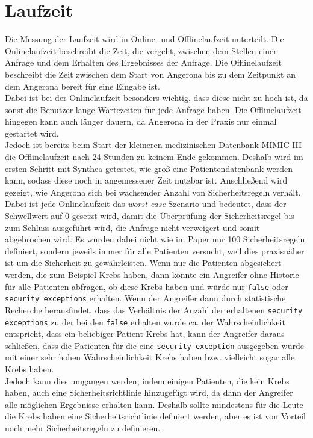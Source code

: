 \documentclass[german,version-2020-11]{uzl-thesis}
\begin{document}
\section{Laufzeit}
Die Messung der Laufzeit wird in Online- und Offlinelaufzeit unterteilt. Die Onlinelaufzeit beschreibt die Zeit, die vergeht, zwischen dem Stellen einer Anfrage und dem Erhalten des Ergebnisses der Anfrage. Die Offlinelaufzeit beschreibt die Zeit zwischen dem Start von Angerona bis zu dem Zeitpunkt an dem Angerona bereit für eine Eingabe ist. \\ 
Dabei ist bei der Onlinelaufzeit besonders wichtig, dass diese nicht zu hoch ist, da sonst die Benutzer lange Wartezeiten  für jede Anfrage haben. Die Offlinelaufzeit hingegen kann auch länger dauern, da Angerona in der Praxis nur einmal gestartet wird.  \\
Jedoch ist bereits beim Start der kleineren medizinischen Datenbank MIMIC-III die Offlinelaufzeit nach 24 Stunden zu keinem Ende gekommen. Deshalb wird im ersten Schritt mit Synthea getestet, wie groß eine Patientendatenbank werden kann, sodass diese noch in angemessener Zeit nutzbar ist.   
Anschließend wird gezeigt, wie Angerona sich bei wachsender Anzahl von Sicherheitsregeln verhält.\\ 
Dabei ist jede Onlinelaufzeit das \emph{worst-case} Szenario und bedeutet, dass der Schwellwert auf 0 gesetzt wird, damit die Überprüfung der Sicherheitsregel bis zum Schluss ausgeführt wird, die Anfrage nicht verweigert und somit abgebrochen wird. Es wurden dabei nicht wie im Paper nur 100 Sicherheitsregeln definiert, sondern jeweils immer für alle Patienten versucht, weil dies praxisnäher ist um die Sicherheit zu gewährleisten. Wenn nur die Patienten abgesichert werden, die zum Beispiel Krebs haben, dann könnte ein Angreifer ohne Historie für alle Patienten abfragen, ob diese Krebs haben und würde nur \texttt{false} oder \texttt{security exceptions} erhalten. Wenn der Angreifer dann durch statistische Recherche herausfindet, dass das Verhältnis der Anzahl der erhaltenen \texttt{security exceptions} zu der bei den \texttt{false} erhalten wurde ca. der Wahrscheinlichkeit entspricht, dass ein beliebiger Patient Krebs hat, kann der Angreifer daraus schließen, dass die Patienten für die eine \texttt{security exception} ausgegeben wurde mit einer sehr hohen Wahrscheinlichkeit Krebs haben bzw. vielleicht sogar alle Krebs haben. \\ 
Jedoch kann dies umgangen werden, indem einigen Patienten, die kein Krebs haben, auch eine Sicherheitsrichtlinie hinzugefügt wird, da dann der Angreifer alle möglichen Ergebnisse erhalten kann. Deshalb sollte mindestens für die Leute die Krebs haben eine Sicherheitsrichtlinie definiert werden, aber es ist von Vorteil noch mehr Sicherheitsregeln zu definieren.
\end{document}
